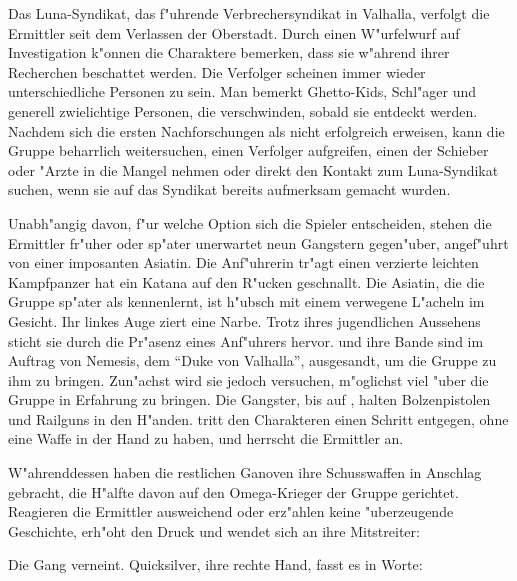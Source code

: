 
Das Luna-Syndikat, das f"uhrende Verbrechersyndikat in Valhalla, verfolgt die Ermittler seit dem Verlassen der Oberstadt. Durch einen W"urfelwurf auf Investigation k"onnen die Charaktere bemerken, dass sie w"ahrend ihrer Recherchen beschattet werden. Die Verfolger scheinen immer wieder unterschiedliche Personen zu sein. Man bemerkt Ghetto-Kids, Schl"ager und generell zwielichtige Personen, die verschwinden, sobald sie entdeckt werden. Nachdem sich die ersten Nachforschungen als nicht erfolgreich erweisen, kann die Gruppe beharrlich weitersuchen, einen Verfolger aufgreifen, einen der Schieber oder "Arzte in die Mangel nehmen oder direkt den Kontakt zum Luna-Syndikat suchen, wenn sie auf das Syndikat bereits aufmerksam gemacht wurden.

Unabh"angig davon, f"ur welche Option sich die Spieler entscheiden, stehen die Ermittler fr"uher oder sp"ater unerwartet neun Gangstern gegen"uber, angef"uhrt von einer imposanten Asiatin. Die Anf"uhrerin tr"agt einen verzierte leichten Kampfpanzer hat ein Katana auf den R"ucken geschnallt. Die Asiatin, die die Gruppe sp"ater als \xls{} kennenlernt, ist h"ubsch mit einem verwegene L"acheln im Gesicht. Ihr linkes Auge ziert eine Narbe. Trotz ihres jugendlichen Aussehens sticht sie durch die Pr"asenz eines Anf"uhrers hervor. \xl{} und ihre Bande sind im Auftrag von Nemesis, dem "`Duke von Valhalla"', ausgesandt, um die Gruppe zu ihm zu bringen. Zun"achst wird sie jedoch versuchen, m"oglichst viel "uber die Gruppe in Erfahrung zu bringen. Die Gangster, bis auf \xl{}, halten Bolzenpistolen und Railguns in den H"anden. \xl{} tritt den Charakteren einen Schritt entgegen, ohne eine Waffe in der Hand zu haben, und herrscht die Ermittler an.


W"ahrenddessen haben die restlichen Ganoven ihre Schusswaffen in Anschlag gebracht, die H"alfte davon auf den Omega-Krieger der Gruppe gerichtet. Reagieren die Ermittler ausweichend oder erz"ahlen keine "uberzeugende Geschichte, erh"oht \xl{} den Druck und wendet sich an ihre Mitstreiter:


Die Gang verneint. Quicksilver, ihre rechte Hand, fasst es in Worte: 

